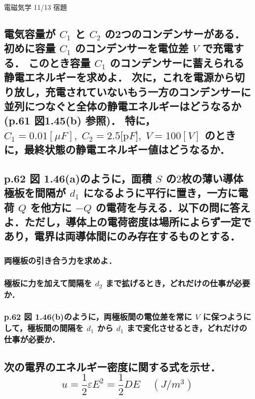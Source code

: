 \documentclass[a4paper, 12pt]{bxjsarticle}
\begin{document}
\begin{center}
    \begin{huge}
        電磁気学 11/13 宿題
    \end{huge}
\end{center}

\subsection{電気容量が \(C_1\) と \(C_2\) の2つのコンデンサーがある．初めに容量 \(C_1\) のコンデンサーを電位差 \(V\) で充電する．
このとき容量 \(C_1\) のコンデンサーに蓄えられる静電エネルギーを求めよ．
次に，これを電源から切り放し，充電されていないもう一方のコンデンサーに並列につなぐと全体の静電エネルギーはどうなるか(p.61 図1.45(b) 参照)．
特に，\(C_1 = 0.01\si{[\mu F]},\;C_2 = 2.5\si{[\pico F]},\;V=100\si{[V]}\) のときに，最終状態の静電エネルギー値はどうなるか．}

\newpage
\begin{samepage}
\subsection{p.62 図 1.46(a)のように，面積 \(S\) の\(2\)枚の薄い導体極板を間隔が \(d_1\) になるように平行に置き，一方に電荷 \(Q\) を他方に \(-Q\) の電荷を与える．以下の問に答えよ．ただし，導体上の電荷密度は場所によらず一定であり，電界は両導体間にのみ存在するものとする．}
\subsubsection{両極板の引き合う力を求めよ．}
\vspace{13em}
\subsubsection{極板に力を加えて間隔を \(d_2\) まで拡げるとき，どれだけの仕事が必要か．}
\vspace{13em}
\subsubsection{p.62 図 1.46(b)のように，両極板間の電位差を常に \(V\) に保つようにして，極板間の間隔を \(d_1\) から \(d_1\) まで変化させるとき，どれだけの仕事が必要か．}
\end{samepage}
\newpage

\subsection{次の電界のエネルギー密度に関する式を示せ．\[u=\frac{1}{2}\varepsilon E^2 = \frac{1}{2} D E\;\;\;\;\si{(J/m^3)}\]}
\end{document}
